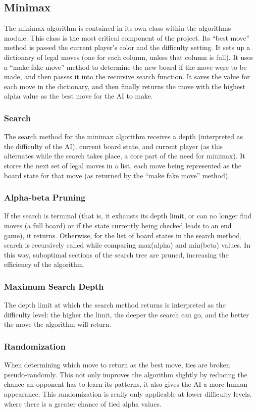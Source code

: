 \documentclass[12pt, article]{scrartcl}
\begin{document}
\subsection{Minimax}
The minimax algorithm is contained in its own class within the algorithms module. This class is the most critical component of the project. Its ``best move'' method is passed the current player's color and the difficulty setting. It sets up a dictionary of legal moves (one for each column, unless that column is full). It uses a ``make fake move'' method to determine the new board if the move were to be made, and then passes it into the recursive search function. It saves the value for each move in the dictionary, and then finally returns the move with the highest alpha value as the best move for the AI to make.

\subsubsection{Search}
The search method for the minimax algorithm receives a depth (interpreted as the difficulty of the AI), current board state, and current player (as this alternates while the search takes place, a core part of the need for minimax). It stores the next set of legal moves in a list, each move being represented as the board state for that move (as returned by the ``make fake move'' method).

\subsubsection{Alpha-beta Pruning}
If the search is terminal (that is, it exhausts its depth limit, or can no longer find moves (a full board) or if the state currently being checked leads to an end game), it returns. Otherwise, for the list of board states in the search method, search is recursively called while comparing max(alpha) and min(beta) values. In this way, suboptimal sections of the search tree are pruned, increasing the efficiency of the algorithm.

\subsubsection{Maximum Search Depth}
The depth limit at which the search method returns is interpreted as the difficulty level: the higher the limit, the deeper the search can go, and the better the move the algorithm will return.

\subsubsection{Randomization}
When determining which move to return as the best move, ties are broken pseudo-randomly. This not only improves the algorithm slightly by reducing the chance an opponent has to learn its patterns, it also gives the AI a more human appearance. This randomization is really only applicable at lower difficulty levels, where there is a greater chance of tied alpha values.
\end{document}
